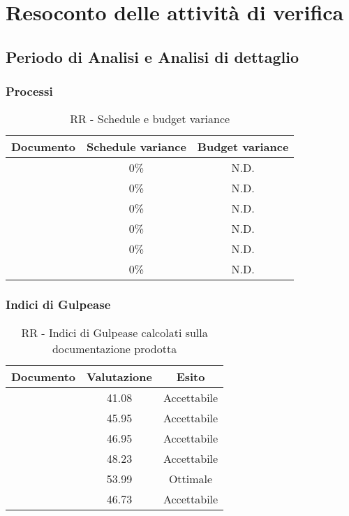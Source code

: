 \documentclass[../PianoDiQualifica.tex]{subfiles}
\begin{document}
	\section{Resoconto delle attività di verifica}\label{sez:resocontoAttivitaVerifica}
		\subsection{Periodo di Analisi e Analisi di dettaglio}
			\subsubsection{Processi}
				\begin{table}[H]
				\center
					\begin{tabular}{|l|c|c|}
						\hline
						\rowcolor{blue!30}\textbf{Documento} & \textbf{Schedule variance} & \textbf{Budget variance} \\ \hline
						\analisideirequisitiRR & 0\% & N.D. \\ \hline
						\glossarioRR & 0\% & N.D. \\ \hline
						\normediprogettoRR & 0\% & N.D. \\ \hline
						\pianodiprogettoRR & 0\% & N.D. \\ \hline
						\pianodiqualificaRR & 0\% & N.D. \\ \hline
						\studiodifattibilitaRR & 0\% & N.D. \\ \hline
					\end{tabular}
				\caption{RR - Schedule e budget variance}
				\end{table}
			\subsubsection{Indici di Gulpease}
				\begin{table}[H]
				\center
					\begin{tabular}{|l|c|c|}
						\hline
						\rowcolor{blue!30}\textbf{Documento} & \textbf{Valutazione} & \textbf{Esito} \\ \hline
						\analisideirequisitiRR & 41.08 & Accettabile \\ \hline
						\glossarioRR & 45.95 & Accettabile \\ \hline
						\normediprogettoRR & 46.95 & Accettabile \\ \hline
						\pianodiprogettoRR & 48.23 & Accettabile \\ \hline
						\pianodiqualificaRR & 53.99 & Ottimale \\ \hline
						\studiodifattibilitaRR & 46.73 & Accettabile \\ \hline
					\end{tabular}
				\caption{RR - Indici di Gulpease calcolati sulla documentazione prodotta}
				\end{table}
\end{document}
